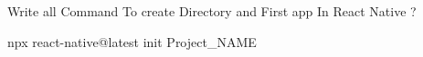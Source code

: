 Write all Command To create Directory and First app In React Native ?

npx react-native@latest init Project_NAME